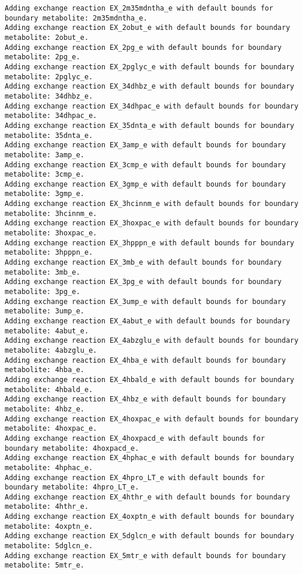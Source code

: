 \documentclass[
  letterpaper,
  DIV=11,
  numbers=noendperiod]{scrartcl}
\begin{document}
\begin{verbatim}
Adding exchange reaction EX_2m35mdntha_e with default bounds for boundary metabolite: 2m35mdntha_e.
Adding exchange reaction EX_2obut_e with default bounds for boundary metabolite: 2obut_e.
Adding exchange reaction EX_2pg_e with default bounds for boundary metabolite: 2pg_e.
Adding exchange reaction EX_2pglyc_e with default bounds for boundary metabolite: 2pglyc_e.
Adding exchange reaction EX_34dhbz_e with default bounds for boundary metabolite: 34dhbz_e.
Adding exchange reaction EX_34dhpac_e with default bounds for boundary metabolite: 34dhpac_e.
Adding exchange reaction EX_35dnta_e with default bounds for boundary metabolite: 35dnta_e.
Adding exchange reaction EX_3amp_e with default bounds for boundary metabolite: 3amp_e.
Adding exchange reaction EX_3cmp_e with default bounds for boundary metabolite: 3cmp_e.
Adding exchange reaction EX_3gmp_e with default bounds for boundary metabolite: 3gmp_e.
Adding exchange reaction EX_3hcinnm_e with default bounds for boundary metabolite: 3hcinnm_e.
Adding exchange reaction EX_3hoxpac_e with default bounds for boundary metabolite: 3hoxpac_e.
Adding exchange reaction EX_3hpppn_e with default bounds for boundary metabolite: 3hpppn_e.
Adding exchange reaction EX_3mb_e with default bounds for boundary metabolite: 3mb_e.
Adding exchange reaction EX_3pg_e with default bounds for boundary metabolite: 3pg_e.
Adding exchange reaction EX_3ump_e with default bounds for boundary metabolite: 3ump_e.
Adding exchange reaction EX_4abut_e with default bounds for boundary metabolite: 4abut_e.
Adding exchange reaction EX_4abzglu_e with default bounds for boundary metabolite: 4abzglu_e.
Adding exchange reaction EX_4hba_e with default bounds for boundary metabolite: 4hba_e.
Adding exchange reaction EX_4hbald_e with default bounds for boundary metabolite: 4hbald_e.
Adding exchange reaction EX_4hbz_e with default bounds for boundary metabolite: 4hbz_e.
Adding exchange reaction EX_4hoxpac_e with default bounds for boundary metabolite: 4hoxpac_e.
Adding exchange reaction EX_4hoxpacd_e with default bounds for boundary metabolite: 4hoxpacd_e.
Adding exchange reaction EX_4hphac_e with default bounds for boundary metabolite: 4hphac_e.
Adding exchange reaction EX_4hpro_LT_e with default bounds for boundary metabolite: 4hpro_LT_e.
Adding exchange reaction EX_4hthr_e with default bounds for boundary metabolite: 4hthr_e.
Adding exchange reaction EX_4oxptn_e with default bounds for boundary metabolite: 4oxptn_e.
Adding exchange reaction EX_5dglcn_e with default bounds for boundary metabolite: 5dglcn_e.
Adding exchange reaction EX_5mtr_e with default bounds for boundary metabolite: 5mtr_e.

\end{verbatim}
\end{document}
